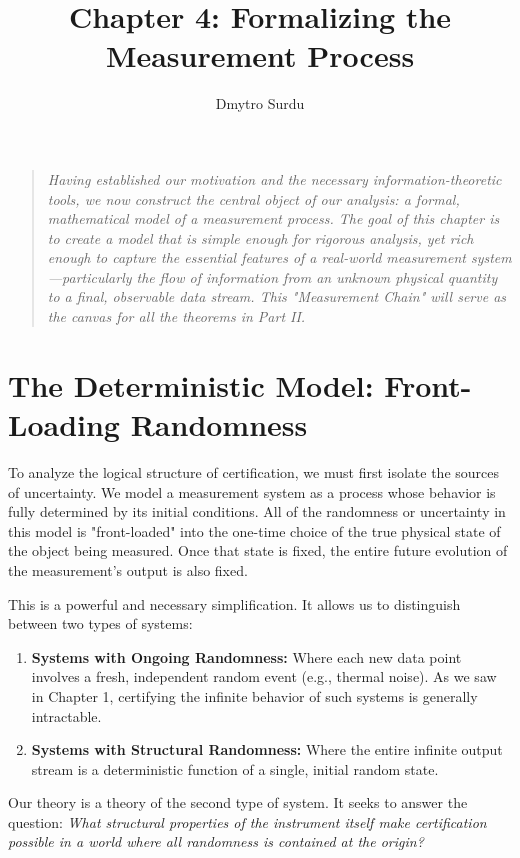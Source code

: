 \documentclass[12pt]{article}
\title{\textbf{Chapter 4: Formalizing the Measurement Process}}
\author{Dmytro Surdu}
\date{}
\theoremstyle{definition}
\begin{document}
\maketitle

\begin{quote}
\textit{Having established our motivation and the necessary information-theoretic tools, we now construct the central object of our analysis: a formal, mathematical model of a measurement process. The goal of this chapter is to create a model that is simple enough for rigorous analysis, yet rich enough to capture the essential features of a real-world measurement system—particularly the flow of information from an unknown physical quantity to a final, observable data stream. This "Measurement Chain" will serve as the canvas for all the theorems in Part II.}
\end{quote}

\section{The Deterministic Model: Front-Loading Randomness}

To analyze the logical structure of certification, we must first isolate the sources of uncertainty. We model a measurement system as a process whose behavior is fully determined by its initial conditions. All of the randomness or uncertainty in this model is "front-loaded" into the one-time choice of the true physical state of the object being measured. Once that state is fixed, the entire future evolution of the measurement's output is also fixed.

This is a powerful and necessary simplification. It allows us to distinguish between two types of systems:
\begin{enumerate}
    \item \textbf{Systems with Ongoing Randomness:} Where each new data point involves a fresh, independent random event (e.g., thermal noise). As we saw in Chapter 1, certifying the infinite behavior of such systems is generally intractable.
    \item \textbf{Systems with Structural Randomness:} Where the entire infinite output stream is a deterministic function of a single, initial random state.
\end{enumerate}

Our theory is a theory of the second type of system. It seeks to answer the question: \textit{What structural properties of the instrument itself make certification possible in a world where all randomness is contained at the origin?}
\end{document}
